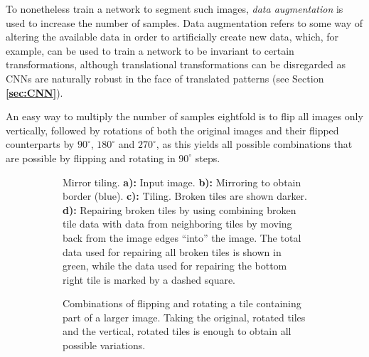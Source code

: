 To nonetheless train a network to segment such images, \textit{data augmentation} is used to increase the number of samples. Data augmentation refers to some way of altering the available data in order to artificially create new data, which, for example, can be used to train a network to be invariant to certain transformations, although translational transformations can be disregarded as CNNs are naturally robust in the face of translated patterns (see Section \textbf{\ref{sec:CNN}}).

An easy way to multiply the number of samples eightfold is to flip all images only vertically, followed by rotations of both the original images and their flipped counterparts by $90^{\circ}$, $180^{\circ}$ and $270^{\circ}$, as this yields all possible combinations that are possible by flipping and rotating in $90^{\circ}$ steps.\\


\begin {figure}[!htb]
	\begin {subfigure}[t]{0.5\linewidth}
		\scalebox{0.5}{}

		\caption*{Mirror tiling. \textbf{a):} Input image. \textbf{b):} Mirroring to obtain border (blue). \textbf{c):} Tiling. Broken tiles are shown darker. \textbf{d):} Repairing broken tiles by using combining broken tile data with data from neighboring tiles by moving back from the image edges ``into'' the image. The total data used for repairing all broken tiles is shown in green, while the data used for repairing the bottom right tile is marked by a dashed square.}
	\end {subfigure}
	\hspace{1cm}
	\begin {subfigure}[t]{0.5\linewidth}
		\scalebox{0.5}{}

		\caption*{Combinations of flipping and rotating a tile containing part of a larger image. Taking the original, rotated tiles and the vertical, rotated tiles is enough to obtain all possible variations.}
	\end {subfigure}

		\caption[Mirror tiling and rotating.]{}
		\label{fig:tile_mirror_rotate}

\end {figure}


